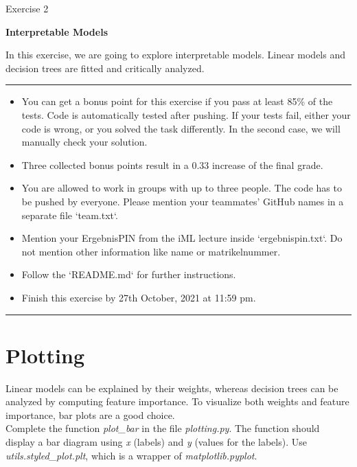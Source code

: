 \documentclass[a4paper]{article}
\begin{document}
{\noindent\LARGE Exercise 2\par}
\vspace{8pt}
{\noindent\huge\textbf{Interpretable Models}}
\vspace{20pt}

\noindent
In this exercise, we are going to explore interpretable models. Linear models and decision trees are fitted and critically analyzed.

\vspace{10pt}
\par\noindent\rule{\textwidth}{0.2pt}
\begin{itemize}
    \item You can get a bonus point for this exercise if you pass at least 85\% of the tests. Code is automatically tested after pushing. If your tests fail, either your code is wrong, or you solved the task differently. In the second case, we will manually check your solution.
    \item Three collected bonus points result in a 0.33 increase of the final grade.
    \item You are allowed to work in groups with up to three people. The code has to be pushed by
everyone. Please mention your teammates' GitHub names in a separate file `team.txt`.
    \item Mention your ErgebnisPIN from the iML lecture inside `ergebnispin.txt`. Do not mention other information like name or matrikelnummer.
    \item Follow the `README.md` for further instructions.
    \item Finish this exercise by 27th October, 2021 at 11:59 pm.
\end{itemize}
\par\noindent\rule{\textwidth}{0.2pt}


\section{Plotting}

\noindent Linear models can be explained by their weights, whereas decision trees can be analyzed by computing feature importance. To visualize both weights and feature importance, bar plots are a good choice.\\

\noindent Complete the function \textit{plot\_bar} in the file \textit{plotting.py}. The function should display a bar diagram using \textit{x} (labels) and \textit{y} (values for the labels). Use \textit{utils.styled\_plot.plt}, which is a wrapper of \textit{matplotlib.pyplot}.
\end{document}
